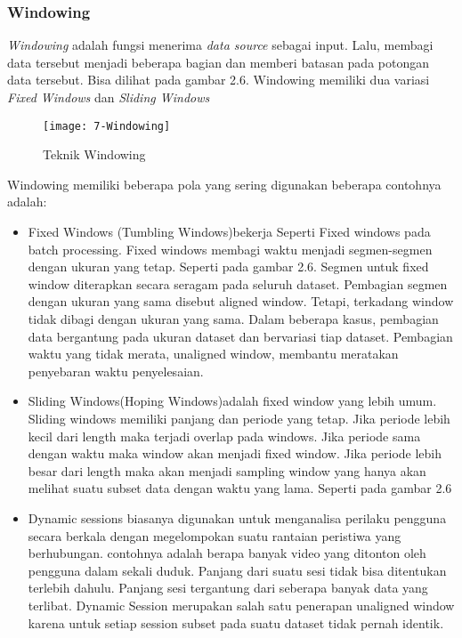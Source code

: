 	
	\subsubsection{Windowing}
	\textit{Windowing} adalah fungsi menerima \textit{data source} sebagai input. Lalu, membagi 	
	data tersebut menjadi beberapa bagian dan memberi batasan pada potongan data tersebut. Bisa 		
	dilihat pada gambar 2.6. Windowing memiliki dua variasi \textit{Fixed Windows} dan 				
	\textit{Sliding Windows} 		
	
	\begin{figure}[H] 
	\centering  
	\texttt{[image: 7-Windowing]}  
	\caption[Gambar {\it Windowing}]{Teknik Windowing} 
	\label{fig:processing-events relationship} 
	\end{figure}
	 
	Windowing memiliki beberapa pola yang sering digunakan beberapa contohnya adalah:
	\begin{itemize}
		\item{Fixed Windows (Tumbling Windows)bekerja Seperti Fixed windows pada batch processing. 
		Fixed windows membagi waktu menjadi segmen-segmen dengan ukuran yang tetap. Seperti pada 
		gambar 2.6. Segmen untuk fixed window diterapkan secara seragam pada seluruh dataset. 
		Pembagian segmen dengan ukuran yang sama disebut aligned window. Tetapi, terkadang window 
		tidak dibagi dengan ukuran yang sama. Dalam beberapa kasus, pembagian data bergantung pada 
		ukuran dataset dan bervariasi tiap dataset. Pembagian waktu yang tidak merata, unaligned 
		window, membantu meratakan penyebaran waktu penyelesaian.
		}
		
		\item{Sliding Windows(Hoping Windows)adalah fixed window yang lebih umum. Sliding windows 
		memiliki panjang dan periode yang tetap. Jika periode lebih kecil dari length maka terjadi 
		overlap pada windows. Jika periode sama dengan waktu maka window akan menjadi fixed window. 
		Jika periode lebih besar dari length maka akan menjadi sampling window yang hanya 
		akan melihat suatu subset data dengan waktu yang lama. Seperti pada gambar 2.6
		
		}
		
		\item{Dynamic sessions biasanya digunakan untuk menganalisa perilaku pengguna secara 
		berkala dengan megelompokan suatu rantaian peristiwa yang berhubungan. contohnya adalah 
		berapa banyak video yang ditonton oleh pengguna dalam sekali duduk. Panjang dari suatu sesi 			tidak bisa ditentukan terlebih dahulu. Panjang sesi tergantung dari seberapa banyak 			
		data yang terlibat. Dynamic Session merupakan salah satu penerapan unaligned window 			
		karena untuk setiap session subset pada suatu dataset tidak pernah identik.
		
		} 
	\end{itemize}
	
